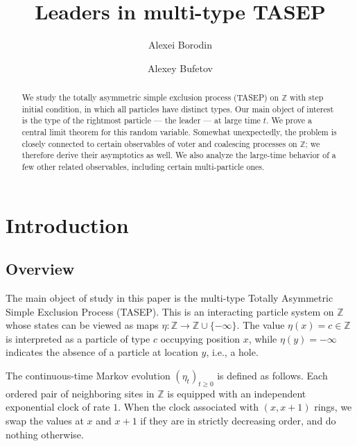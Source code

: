 \documentclass[11pt,reqno]{amsart}
\theoremstyle{definition}
\theoremstyle{remark}
\theoremstyle{remark}
\def\geq{\geqslant}
\renewcommand\ge{\geq}
\numberwithin{equation}{section}
\begin{document}
	
	\title{Leaders in multi-type TASEP}
	
	\author{Alexei Borodin}\address[Alexei Borodin]{Department of Mathematics, Massachusetts Institute of Technology, U.S.A.}
	
	\author{Alexey Bufetov}\address[Alexey Bufetov]{Institute of Mathematics, Leipzig University, Germany.}
	
	
	\begin{abstract}
		We study the totally asymmetric simple exclusion process (TASEP) on 
		$\mathbb{Z}$ with step initial condition, in which all particles have distinct types. Our main object of interest is the type of the rightmost particle --- the leader --- at large time $t$. We prove a central limit theorem for this random variable. Somewhat unexpectedly, the problem is closely connected to certain observables of voter and coalescing processes on $\mathbb{Z}$; we therefore derive their asymptotics as well. We also analyze the large-time behavior of a few other related observables, including certain multi-particle ones.
	\end{abstract}
	
	\maketitle
	
	\setcounter{tocdepth}{1}
	\makeatletter
	\def\l@subsection{\@tocline{2}{0pt}{2.5pc}{5pc}{}}
	\makeatother
	\tableofcontents
	
	\section{Introduction}
	
	\subsection{Overview}
	
	The main object of study in this paper is the multi-type Totally Asymmetric Simple Exclusion Process (TASEP). This is an interacting particle system on $\mathbb{Z}$ whose states can be viewed as maps $\eta:\mathbb{Z}\to \mathbb{Z}\cup\{-\infty\}$. The value $\eta(x)=c\in \mathbb{Z}$ is interpreted as a particle of type $c$ occupying position $x$, while $\eta(y)=-\infty$ indicates the absence of a particle at location $y$, i.e., a hole.
	
	The continuous-time Markov evolution $(\eta_t)_{t\ge 0}$ is defined as follows. Each ordered pair of neighboring sites in $\mathbb{Z}$ is equipped with an independent exponential clock of rate $1$. When the clock associated with $(x,x+1)$ rings, we swap the values at $x$ and $x+1$ if they are in strictly decreasing order, and do nothing otherwise.
	
\end{document}

